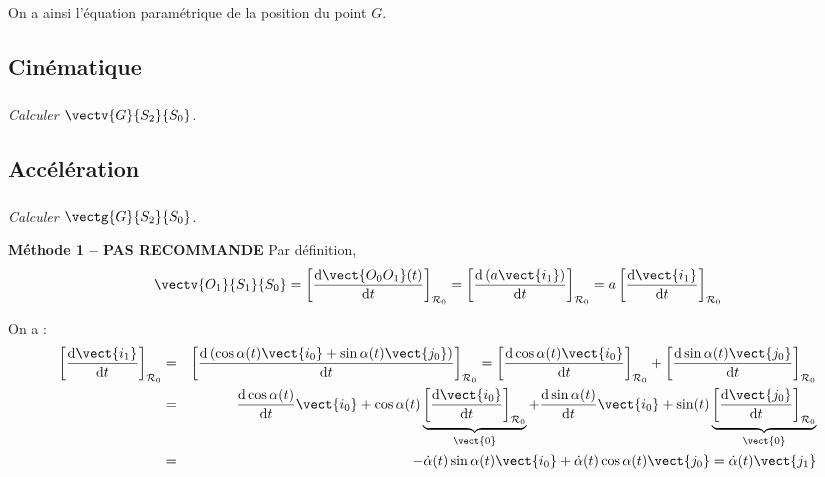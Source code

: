 \begin{multicols}{2}
\begin{corrige}
On a ainsi l'équation paramétrique de la position du point $G$.

\end{corrige}
\else \fi


\subsection*{Cinématique}
%
%

\subparagraph{}
\textit{Calculer $\vectv{G}{S_2}{S_0}$.}




%

\subsection*{Accélération}

\subparagraph{}
\textit{Calculer $\vectg{G}{S_2}{S_0}$.}


\ifprof
\begin{corrige}


\textbf{Méthode 1 -- PAS RECOMMANDE }
Par définition, 
$$
\vectv{O_1}{S_1}{S_0} 
= \left[\dfrac{\text{d}\vect{O_0O_1}(t)}{\text{d}t}\right]_{\mathcal{R}_0}
= \left[\dfrac{\text{d} \left(a \vect{i_1}\right) }{\text{d}t}\right]_{\mathcal{R}_0}
= a \left[\dfrac{\text{d}  \vect{i_1} }{\text{d}t}\right]_{\mathcal{R}_0}
$$

On a :
\begin{eqnarray*}
\left[\dfrac{\text{d}  \vect{i_1} }{\text{d}t}\right]_{\mathcal{R}_0}
&=&\left[\dfrac{\text{d} \left(\cos\alpha(t)\vect{i_0}+\sin\alpha(t)\vect{j_0} \right)}{\text{d}t}\right]_{\mathcal{R}_0}
=\left[\dfrac{\text{d}  \cos\alpha(t)\vect{i_0}}{\text{d}t}\right]_{\mathcal{R}_0}
+\left[\dfrac{\text{d}  \sin\alpha(t)\vect{j_0} }{\text{d}t}\right]_{\mathcal{R}_0}\\
& = & 
\dfrac{\text{d} \cos\alpha(t)}{\text{d}t} \vect{i_0}  
+\cos\alpha(t)\underbrace{\left[\dfrac{\text{d}  \vect{i_0}}{\text{d}t}\right]_{\mathcal{R}_0}}_{\vect{0}}
+\dfrac{\text{d} \sin\alpha(t)}{\text{d}t} \vect{i_0}  
+\sin(t)\underbrace{\left[\dfrac{\text{d}  \vect{j_0}}{\text{d}t}\right]_{\mathcal{R}_0}}_{\vect{0}}\\
& = & -\dot{\alpha}(t)\sin\alpha(t) \vect{i_0}   + \dot{\alpha}(t)\cos\alpha(t) \vect{j_0}  = 
\dot{\alpha}(t)\vect{j_1}
\end{eqnarray*}


\end{corrige}
\end{multicols}
